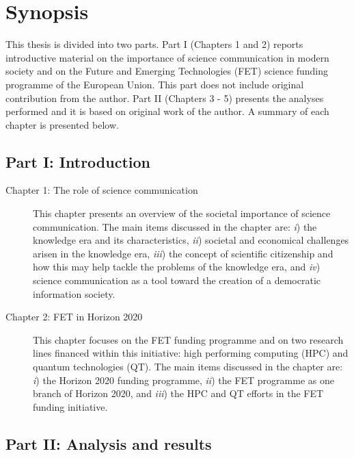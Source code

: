 \chapter*{Synopsis}
This thesis is divided into two parts. Part I (Chapters 1 and 2) reports introductive material on the importance of science communication in modern society and on the Future and Emerging Technologies (FET) science funding programme of the European Union. This part does not include original contribution from the author. Part II (Chapters 3 - 5) presents the analyses performed and it is based on original work of the author. A summary of each chapter is presented below.

\section*{Part I: Introduction}

\begin{description}
 \item [Chapter 1: The role of science communication] This chapter presents an overview of the societal importance of science communication. The main items discussed in the chapter are: \emph{i}) the knowledge era and its characteristics, \emph{ii}) societal and economical challenges arisen in the knowledge era, \emph{iii}) the concept of scientific citizenship and how this may help tackle the problems of the knowledge era, and \emph{iv}) science communication as a tool toward the creation of a democratic information society.

 \item [Chapter 2: FET in Horizon 2020] This chapter focuses on the FET funding programme and on two research lines financed within this initiative: high performing computing (HPC) and quantum technologies (QT). The main items discussed in the chapter are: \emph{i}) the Horizon 2020 funding programme, \emph{ii}) the FET programme as one branch of Horizon 2020, and \emph{iii}) the HPC and QT efforts in the FET funding initiative.
\end{description}

\section*{Part II: Analysis and results}


